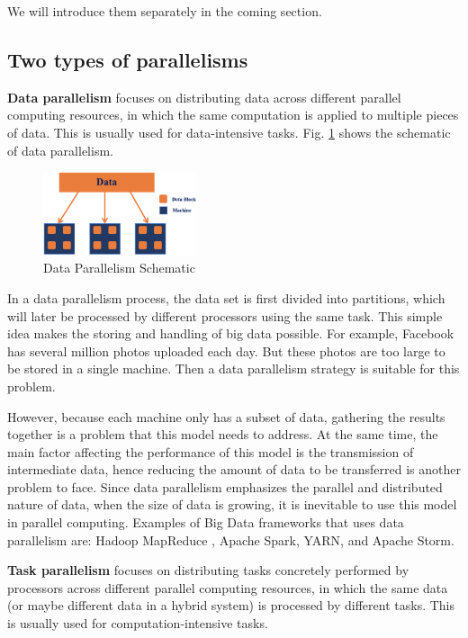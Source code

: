 \documentclass[	DIV=calc,%
							paper=a4,%
							fontsize=11pt,%
							twocolumn]{scrartcl}	 					%
\begin{document}
We will introduce them separately in the coming section. 

\subsection*{Two types of parallelisms}

\textbf{Data parallelism} focuses on distributing data across different parallel computing resources, in which the same computation is applied to multiple pieces of data. This is usually used for data-intensive tasks. Fig. \ref{fig:data_para} shows the schematic of data parallelism.

\begin{figure}
  \centering
    \includegraphics[width=0.4\textwidth]{images/data_para.png}
    \caption{Data Parallelism Schematic}
    \label{fig:data_para}   
\end{figure}

In a data parallelism process, the data set is first divided into partitions, which will later be processed by different processors using the same task. This simple idea makes the storing and handling of big data possible. For example, Facebook has several million photos uploaded each day. But these photos are too large to be stored in a single machine. Then a data parallelism strategy is suitable for this problem.

However, because each machine only has a subset of data, gathering the results together is a problem that this model needs to address. At the same time, the main factor affecting the performance of this model is the transmission of intermediate data, hence reducing the amount of data to be transferred is another problem to face.
Since data parallelism emphasizes the parallel and distributed nature of data, when the size of data is growing, it is inevitable to use this model in parallel computing. Examples of Big Data frameworks that uses data parallelism are: Hadoop MapReduce \cite{1}, Apache Spark\cite{2}, YARN\cite{3}, and Apache Storm\cite{4}.

\textbf{Task parallelism} focuses on distributing tasks concretely performed by processors across different parallel computing resources, in which the same data (or maybe different data in a hybrid system) is processed by different tasks. This is usually used for computation-intensive tasks.
\end{document}
